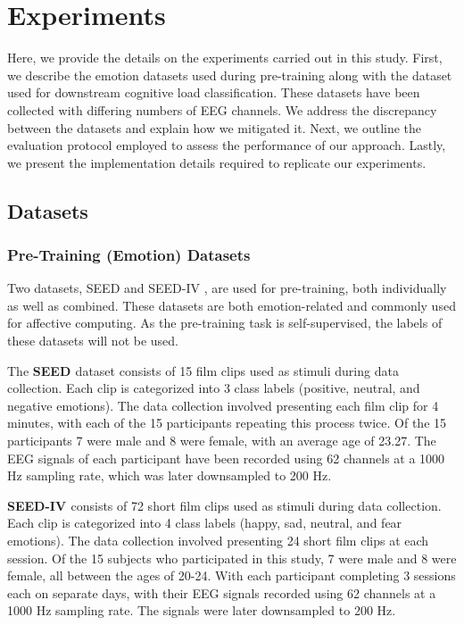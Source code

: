 \documentclass[sigconf]{acmart}
\begin{document}
\section{Experiments}\label{Experimentation}
Here, we provide the details on the experiments carried out in this study. First, we describe the emotion datasets used during pre-training along with the dataset used for downstream cognitive load classification. These datasets have been collected with differing numbers of EEG channels. We address the discrepancy between the datasets and explain how we mitigated it. Next, we outline the evaluation protocol employed to assess the performance of our approach. Lastly, we present the implementation details required to replicate our experiments.

\subsection{Datasets} \label{Datasets}
\subsubsection{Pre-Training (Emotion) Datasets}
Two datasets, SEED \cite{duan2013differential, zheng2015investigating} and SEED-IV \cite{zheng2018emotionmeter}, are used for pre-training, both individually as well as combined. These datasets are both emotion-related and commonly used for affective computing. As the pre-training task is self-supervised, the labels of these datasets will not be used.

\noindent The \textbf{SEED \cite{duan2013differential, zheng2015investigating}} dataset consists of 15 film clips used as stimuli during data collection. Each clip is categorized into 3 class labels (positive, neutral, and negative emotions). The data collection involved presenting each film clip for 4 minutes, with each of the 15 participants repeating this process twice. Of the 15 participants 7 were male and 8 were female, with an average age of 23.27. The EEG signals of each participant have been recorded using 62 channels at a 1000 Hz sampling rate, which was later downsampled to 200 Hz.

\noindent \textbf{SEED-IV \cite{zheng2018emotionmeter}} consists of 72 short film clips used as stimuli during data collection. Each clip is categorized into 4 class labels (happy, sad, neutral, and fear emotions). The data collection involved presenting 24 short film clips at each session. Of the 15 subjects who participated in this study, 7 were male and 8 were female, all between the ages of 20-24. With each participant completing 3 sessions each on separate days, with their EEG signals recorded using 62 channels at a 1000 Hz sampling rate. The signals were later downsampled to 200 Hz.
\end{document}
